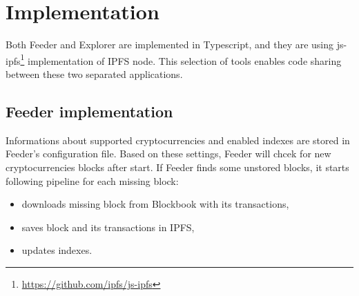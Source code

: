 \chapter{Implementation}
\label{Implementation}

Both Feeder and Explorer are implemented in Typescript, and they are using js-ipfs\footnote{\url{https://github.com/ipfs/js-ipfs}} implementation of IPFS node. This selection of tools enables code sharing between these two separated applications.

\section{Feeder implementation}
Informations about supported cryptocurrencies and enabled indexes are stored in Feeder's configuration file. Based on these settings, Feeder will chcek for new cryptocurrencies blocks after start. If Feeder finds some unstored blocks, it starts following pipeline for each missing block:
\begin{itemize}
    \item downloads missing block from Blockbook with its transactions,
    \item saves block and its transactions in IPFS,
    \item updates indexes. 
\end{itemize}


